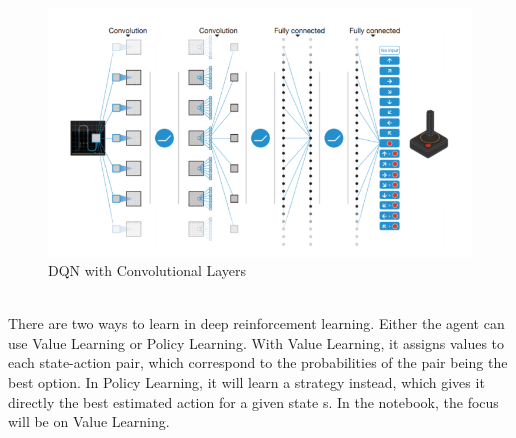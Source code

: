 		\begin{figure}[h!]
			\begin{center}
				\includegraphics[width=0.7\linewidth]{img/v2-67ef75bb7f5e67b2a42645aa821894bf_hd.png}
				\caption{DQN with Convolutional Layers}
				\label{cnndqn}
			\end{center}
		\end{figure}\\
		There are two ways to learn in deep reinforcement learning.
		 Either the agent can use Value Learning or Policy Learning.
		 With Value Learning, it assigns values to each state-action pair, which correspond to the probabilities of the pair being the best option.
		 In Policy Learning, it will learn a strategy instead, which gives it directly the best estimated action for a given state s. 
		 In the notebook, the focus will be on Value Learning. 
			
